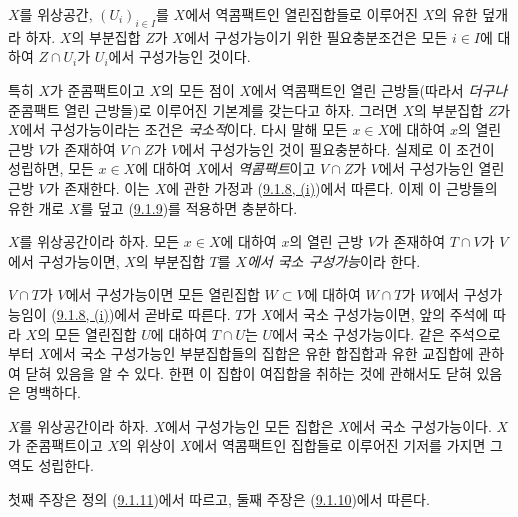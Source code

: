 \begin{corollary}[9.1.9]
\label{0.9.1.9-ko}
$X$를 위상공간, $(U_i)_{i\in I}$를 $X$에서 역콤팩트인 열린집합들로
이루어진 $X$의 유한 덮개라 하자. $X$의 부분집합 $Z$가 $X$에서
구성가능이기 위한 필요충분조건은 모든 $i\in I$에 대하여 $Z\cap U_i$가
$U_i$에서 구성가능인 것이다.
\end{corollary}

\begin{env}[9.1.10]
\label{0.9.1.10-ko}
특히 $X$가 준콤팩트이고 $X$의 모든 점이
$X$에서 역콤팩트인 열린
근방들(따라서 \emph{더구나} 준콤팩트 열린 근방들)로 이루어진 기본계를
갖는다고 하자. 그러면 $X$의 부분집합 $Z$가 $X$에서 구성가능이라는
조건은 \emph{국소적}이다. 다시 말해 모든 $x\in X$에 대하여 $x$의
열린 근방 $V$가 존재하여 $V\cap Z$가 $V$에서 구성가능인 것이
필요충분하다. 실제로 이 조건이 성립하면, 모든 $x\in X$에 대하여
$X$에서 \emph{역콤팩트}이고 $V\cap Z$가 $V$에서 구성가능인 열린 근방
$V$가 존재한다. 이는 $X$에 관한 가정과
(\hyperref[0.9.1.8-ko]{9.1.8, (i)})에서 따른다. 이제 이 근방들의 유한
개로 $X$를 덮고 (\hyperref[0.9.1.9-ko]{9.1.9})를 적용하면 충분하다.
\end{env}

\begin{definition}[9.1.11]
\label{0.9.1.11-ko}
$X$를 위상공간이라 하자. 모든 $x\in X$에 대하여 $x$의 열린 근방 $V$가
존재하여 $T\cap V$가 $V$에서 구성가능이면, $X$의 부분집합 $T$를
\emph{$X$에서 국소 구성가능}이라 한다.
\end{definition}

$V\cap T$가 $V$에서 구성가능이면 모든 열린집합 $W\subset V$에 대하여
$W\cap T$가 $W$에서 구성가능임이
(\hyperref[0.9.1.8-ko]{9.1.8, (i)})에서 곧바로 따른다. $T$가 $X$에서
국소 구성가능이면, 앞의 주석에 따라 $X$의 모든 열린집합 $U$에 대하여
$T\cap U$는 $U$에서 국소 구성가능이다. 같은 주석으로부터 $X$에서
국소 구성가능인 부분집합들의 집합은 유한 합집합과 유한 교집합에
관하여 닫혀 있음을 알 수 있다. 한편 이 집합이 여집합을 취하는 것에
관해서도 닫혀 있음은 명백하다.

\begin{proposition}[9.1.12]
\label{0.9.1.12-ko}
$X$를 위상공간이라 하자. $X$에서 구성가능인 모든 집합은 $X$에서
국소 구성가능이다. $X$가 준콤팩트이고 $X$의 위상이 $X$에서 역콤팩트인
집합들로 이루어진 기저를 가지면 그 역도 성립한다.
\end{proposition}

첫째 주장은 정의 (\hyperref[0.9.1.11-ko]{9.1.11})에서 따르고, 둘째
주장은 (\hyperref[0.9.1.10-ko]{9.1.10})에서 따른다.

